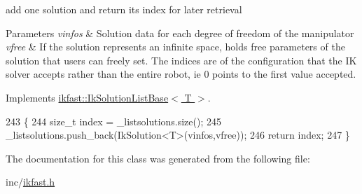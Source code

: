 add one solution and return its index for later retrieval 


\begin{DoxyParams}{Parameters}
{\em vinfos} & Solution data for each degree of freedom of the manipulator \\
\hline
{\em vfree} & If the solution represents an infinite space, holds free parameters of the solution that users can freely set. The indices are of the configuration that the I\-K solver accepts rather than the entire robot, ie 0 points to the first value accepted. \\
\hline
\end{DoxyParams}


Implements \hyperlink{classikfast_1_1IkSolutionListBase_a9d862f550472c2fa15189946b12222bf}{ikfast\-::\-Ik\-Solution\-List\-Base$<$ T $>$}.


\begin{DoxyCode}
243     \{
244         \textcolor{keywordtype}{size\_t} index = \_listsolutions.size();
245         \_listsolutions.push\_back(IkSolution<T>(vinfos,vfree));
246         \textcolor{keywordflow}{return} index;
247     \}
\end{DoxyCode}


The documentation for this class was generated from the following file\-:\begin{DoxyCompactItemize}
\item 
inc/\hyperlink{ikfast_8h}{ikfast.\-h}\end{DoxyCompactItemize}
